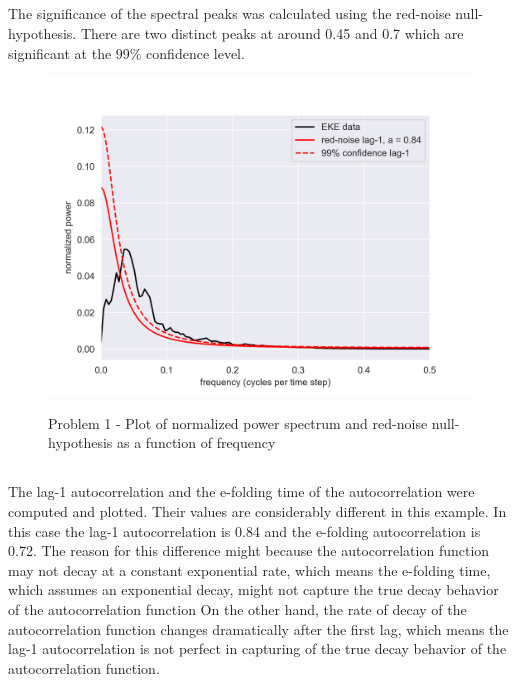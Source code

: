 \documentclass[12pt]{article}
\begin{document}
\subsection{}\label{subsec:problem-1-b}
The significance of the spectral peaks was calculated using the red-noise null-hypothesis.
There are two distinct peaks at around 0.45 and 0.7 which are significant at the 99\% confidence level.

\begin{figure}
\begin{center}
\includegraphics[width=6in]{hw4_pr1_2_power_spectrum_red_noise.png}
\caption{Problem 1 - Plot of normalized power spectrum and red-noise null-hypothesis as a function of frequency}{\label{fig:problem-1-a}}
\end{center}
\end{figure}

\subsection{}\label{subsec:problem-1-c}
The lag-1 autocorrelation and the e-folding time of the autocorrelation were computed and plotted.
Their values are considerably different in this example.
In this case the lag-1 autocorrelation is 0.84 and the e-folding autocorrelation is 0.72.
The reason for this difference might because the autocorrelation function may not decay at a constant exponential rate, which means the e-folding time, which assumes an exponential decay, might not capture the true decay behavior of the autocorrelation function
On the other hand, the rate of decay of the autocorrelation function changes dramatically after the first lag, which means the lag-1 autocorrelation is not perfect in capturing of the true decay behavior of the autocorrelation function.
\end{document}
